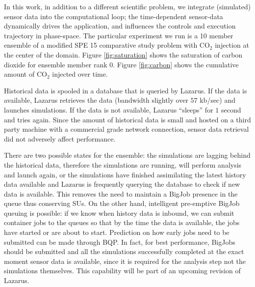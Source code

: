 \documentclass{acm_proc_article-sp}
\newcommand{\jhanote}[1]{ {\textcolor{red} { ***Jha: #1 }}}
\newcommand{\jhanote}[1]{}
\begin{document}
In this work, in addition to a different scientific problem, we
integrate (simulated) sensor data into the computational loop; the
time-dependent sensor-data dynamically drives the application, and
influences the controls and execution trajectory in phase-space. The
particular experiment we run is a 10 member ensemble of a modified SPE 15 comparative study problem
with CO$_2$ injection at the center of the domain. Figure \ref{fig:saturation}
shows the saturation of carbon dioxide for ensemble member rank $0$. Figure \ref{fig:carbon}
shows the cumulative amount of CO$_2$ injected over time.

Historical data is spooled in a database that is queried by Lazarus. If the data is available,
Lazarus retrieves the data (bandwidth slightly over $57$ kb/sec) and launches
simulations. If the data is not available, Lazarus ``sleeps'' for $1$ second
and tries again. Since the amount of historical data is small and hosted
on a third party machine with a commercial grade network connection, sensor
data retrieval did not adversely affect performance.

There are two possible states for the ensemble: the simulations are lagging behind
the historical data, therefore the simulations are running, will perform analysis
and launch again, or the simulations have finished assimilating the latest history
data available and Lazarus is frequently querying the database to check if new data
is available. This removes the need to maintain a BigJob presence in the queue
thus conserving SUs. On the other hand, intelligent pre-emptive BigJob queuing is possible:
if we know when history data is inbound, we can submit container jobs to the queues
so that by the time the data is available, the jobs have started or are about to start. Prediction
on how early jobs need to be submitted can be made through BQP. In fact, for best performance,
BigJobs should be submitted and all the simulations successfully completed at the exact moment
sensor data is available, since it is required for the analysis step not the simulations
themselves. This capability will be part of an upcoming revision of Lazarus.

\end{document}
